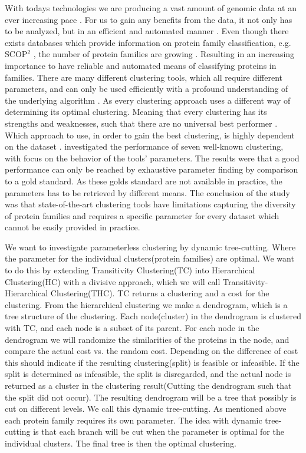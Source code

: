 \documentclass[a4paper,10pt]{article}
\theoremstyle{plain}
\theoremstyle{definition}
\begin{document}
With todays technologies we are producing a vast amount of genomic data at an ever increasing pace \cite{natureReviewsGenetics}. For us to gain any benefits from the data, it not only has to be analyzed, but in an efficient and automated manner \cite{powerLimits}. Even though there exists databases which provide information on protein family classification, e.g. SCOP$^2$ \cite{6powerLimits}, the number of protein families are growing \cite{7powerLimits}. Resulting in an increasing importance to have reliable and automated means of classifying proteins in families. There are many different clustering tools, which all require different parameters, and can only be used efficiently with a profound understanding of the underlying algorithm \cite{powerLimits}. As every clustering approach uses a different way of determining its optimal clustering. Meaning that every clustering has its strengths and weaknesses, such that there are no universal best performer \cite{powerLimits}. Which approach to use, in order to gain the best clustering, is highly dependent on the dataset \cite{powerLimits}. \cite{powerLimits} investigated the performance of seven well-known clustering, with focus on the behavior of the tools' parameters. The results were that a good performance can only be reached by exhaustive parameter finding by comparison to a gold standard. As these golds standard are not available in practice, the parameters has to be retrieved by different means. The conclusion of the study was that state-of-the-art clustering tools have limitations capturing the diversity of protein families and requires a specific parameter for every dataset which cannot be easily provided in practice.

We want to investigate parameterless clustering by dynamic tree-cutting. Where the parameter for the individual clusters(protein families) are optimal. We want to do this by extending Transitivity Clustering(TC) into Hierarchical Clustering(HC) with a divisive approach, which we will call Transitivity-Hierarchical Clustering(THC). TC returns a clustering and a cost for the clustering. From the hierarchical clustering we make a dendrogram, which is a tree structure of the clustering. Each node(cluster) in the dendrogram is clustered with TC, and each node is a subset of its parent. For each node in the dendrogram we will randomize the similarities of the proteins in the node, and compare the actual cost vs. the random cost. Depending on the difference of cost this should indicate if the resulting clustering(split) is feasible or infeasible. If the split is determined as infeasible, the split is disregarded, and the actual node is returned as a cluster in the clustering result(Cutting the dendrogram such that the split did not occur). The resulting dendrogram will be a tree that possibly is cut on different levels. We call this dynamic tree-cutting. As mentioned above each protein family requires its own parameter. The idea with dynamic tree-cutting is that each branch will be cut when the parameter is optimal for the individual clusters. The final tree is then the optimal clustering.
\end{document}
